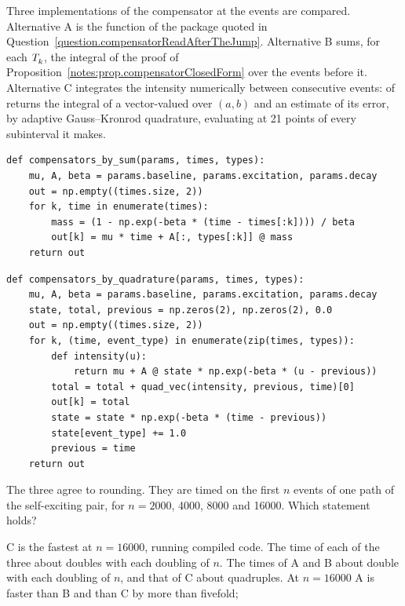 \begin{question}
\label{question.compensatorByRecursionSumOrQuadrature}
Three implementations of the compensator at the events are compared.
Alternative A is the function of the package
quoted in Question~\ref{question.compensatorReadAfterTheJump}.
Alternative B sums,
for each $\arrivalTimes[ ]_k$,
the integral of the proof of Proposition~\ref{notes:prop.compensatorClosedForm}
over the events before it.
Alternative C integrates the intensity numerically between consecutive events:
 of  returns the integral of a vector-valued 
over $(a, b)$ and an estimate of its error,
by adaptive Gauss--Kronrod quadrature,
evaluating  at 21 points of every subinterval it makes.
\begin{lstlisting}[caption={Alternative B}, label=listing.compensatorBySum]
def compensators_by_sum(params, times, types):
    mu, A, beta = params.baseline, params.excitation, params.decay
    out = np.empty((times.size, 2))
    for k, time in enumerate(times):
        mass = (1 - np.exp(-beta * (time - times[:k]))) / beta
        out[k] = mu * time + A[:, types[:k]] @ mass
    return out
\end{lstlisting}
\begin{lstlisting}[caption={Alternative C}, label=listing.compensatorByQuadrature]
def compensators_by_quadrature(params, times, types):
    mu, A, beta = params.baseline, params.excitation, params.decay
    state, total, previous = np.zeros(2), np.zeros(2), 0.0
    out = np.empty((times.size, 2))
    for k, (time, event_type) in enumerate(zip(times, types)):
        def intensity(u):
            return mu + A @ state * np.exp(-beta * (u - previous))
        total = total + quad_vec(intensity, previous, time)[0]
        out[k] = total
        state = state * np.exp(-beta * (time - previous))
        state[event_type] += 1.0
        previous = time
    return out
\end{lstlisting}
The three agree to rounding.
They are timed on the first $n$ events of one path of the self-exciting pair,
for $n = 2000$, 4000, 8000 and 16000.
Which statement holds?
\begin{choices}
 \choice C is the fastest at $n = 16000$,  running compiled code.
 \choice The time of each of the three about doubles with each doubling of $n$.
 \choice The times of A and B about double with each doubling of $n$,
  and that of C about quadruples.
 \correctchoice At $n = 16000$ A is faster than B and than C by more than fivefold;

\end{choices}
\end{question}
